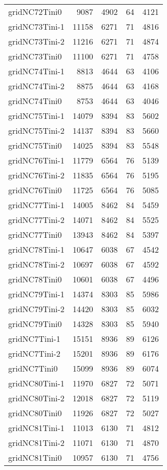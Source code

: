 \documentclass[../../../thesis.tex]{subfiles}
\begin{document}
\begin{longtable}{lrrrr}
gridNC72Tini0 & 9087 & 4902 & 64 & 4121 \\
gridNC73Tini-1 & 11158 & 6271 & 71 & 4816 \\
gridNC73Tini-2 & 11216 & 6271 & 71 & 4874 \\
gridNC73Tini0 & 11100 & 6271 & 71 & 4758 \\
gridNC74Tini-1 & 8813 & 4644 & 63 & 4106 \\
gridNC74Tini-2 & 8875 & 4644 & 63 & 4168 \\
gridNC74Tini0 & 8753 & 4644 & 63 & 4046 \\
gridNC75Tini-1 & 14079 & 8394 & 83 & 5602 \\
gridNC75Tini-2 & 14137 & 8394 & 83 & 5660 \\
gridNC75Tini0 & 14025 & 8394 & 83 & 5548 \\
gridNC76Tini-1 & 11779 & 6564 & 76 & 5139 \\
gridNC76Tini-2 & 11835 & 6564 & 76 & 5195 \\
gridNC76Tini0 & 11725 & 6564 & 76 & 5085 \\
gridNC77Tini-1 & 14005 & 8462 & 84 & 5459 \\
gridNC77Tini-2 & 14071 & 8462 & 84 & 5525 \\
gridNC77Tini0 & 13943 & 8462 & 84 & 5397 \\
gridNC78Tini-1 & 10647 & 6038 & 67 & 4542 \\
gridNC78Tini-2 & 10697 & 6038 & 67 & 4592 \\
gridNC78Tini0 & 10601 & 6038 & 67 & 4496 \\
gridNC79Tini-1 & 14374 & 8303 & 85 & 5986 \\
gridNC79Tini-2 & 14420 & 8303 & 85 & 6032 \\
gridNC79Tini0 & 14328 & 8303 & 85 & 5940 \\
gridNC7Tini-1 & 15151 & 8936 & 89 & 6126 \\
gridNC7Tini-2 & 15201 & 8936 & 89 & 6176 \\
gridNC7Tini0 & 15099 & 8936 & 89 & 6074 \\
gridNC80Tini-1 & 11970 & 6827 & 72 & 5071 \\
gridNC80Tini-2 & 12018 & 6827 & 72 & 5119 \\
gridNC80Tini0 & 11926 & 6827 & 72 & 5027 \\
gridNC81Tini-1 & 11013 & 6130 & 71 & 4812 \\
gridNC81Tini-2 & 11071 & 6130 & 71 & 4870 \\
gridNC81Tini0 & 10957 & 6130 & 71 & 4756 \\

\end{longtable}
\end{document}
